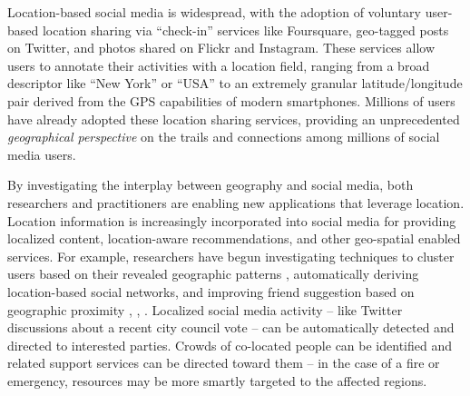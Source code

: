 \ifdefined\THESIS
    \pagestyle{plain} %
    \setcounter{page}{1}
\else
\fi


Location-based social media is widespread, with the adoption of voluntary
user-based location sharing via ``check-in'' services like Foursquare,
geo-tagged posts on Twitter, and photos shared on Flickr and Instagram.
%
These services allow users to annotate their activities with a location field,
ranging from a broad descriptor like ``New York'' or ``USA'' to an extremely
granular latitude/longitude pair  derived from the GPS capabilities of modern
smartphones.
%
Millions of users have already adopted these location sharing services,
providing an unprecedented \textit{geographical perspective} on the trails and
connections among millions of social media users.

By investigating the interplay between geography and social media, both
researchers and practitioners are enabling new applications that leverage
location.
%
Location information is increasingly incorporated into social media for
providing localized content, location-aware recommendations, and other
geo-spatial enabled services.
%
For example, researchers have begun investigating techniques to cluster users
based on their revealed geographic patterns \cite{scellato2010distance},
automatically deriving location-based social networks, and improving friend
suggestion based on geographic proximity \cite{cranshaw2010bridging},
\cite{wang2011human}, \cite{crandall2010inferring}.
%
Localized social media activity -- like Twitter discussions about a recent city
council vote -- can be automatically detected and directed to interested
parties.
%
Crowds of co-located people can be identified and related support services can
be directed toward them -- in the case of a fire or emergency, resources may be
more smartly targeted to the affected regions.


